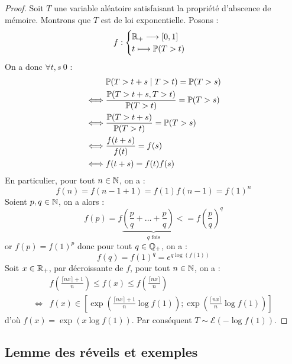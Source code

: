 \begin{proof}
    Soit $T$ une variable aléatoire satisfaisant la propriété d'abscence de mémoire. Montrons que $T$
    est de loi exponentielle. Posons : 
        $$ f : 
            \begin{cases}
                \mathbb{R}_+ \longrightarrow [0,1] \\ 
                t \longmapsto \mathbb{P}(T > t)  
            \end{cases}
        $$ 
    On a donc $ \forall t,s \> 0$ : 
        \begin{align*}
            & \mathbb{P}(T > t+s \mid T > t) = \mathbb{P}(T > s) \\ 
            \iff & \frac{\mathbb{P}(T > t+s, T > t)}{ \mathbb{P}(T > t) } = \mathbb{P}(T > s) \\ 
            \iff & \frac{\mathbb{P}(T > t+s)}{ \mathbb{P}(T > t) } = \mathbb{P}(T > s) \\ 
            \iff & \frac{f(t+s)}{f(t)} = f(s) \\ 
            \iff & f(t+s) = f(t) f(s)
        \end{align*}
    En particulier, pour tout $ n \in \mathbb{N}$, on a : 
        $$ f(n) = f(n - 1 + 1) = f(1)f(n-1) = f(1)^n $$ 
    Soient $p,q \in \mathbb{N}$, on a alors : 
        $$ f(p) = f \underbrace{\left( \frac{p}{q} + \dots + \frac{p}{q}\right)<}_{q \text{ fois} } = f \left(\frac{p}{q} \right)^q $$ 
    or $f(p) = f(1)^p$ donc pour tout $q \in \mathbb{Q}_+$, on a : 
        $$ f(q) = f(1)^q = e^{q \log(f(1))} $$ 
    Soit $x \in \mathbb{R}_+$, par décroissante de $f$, pour tout $ n \in \mathbb{N}$, on a :
        \begin{align*}
            & f \left( \frac{ \lceil nx \rceil +1}{n} \right) \leqslant f(x) \leqslant f \left( \frac{\lceil nx \rceil}{n} \right) \\ 
            \iff & f(x) \in \left[ \exp \left( \frac{\lceil nx \rceil +1}{n} \log f(1) \right); \exp \left( \frac{\lceil nx \rceil}{n} \log f(1)  \right) \right]
        \end{align*}
    d'où $f(x) = \exp ( x \log f(1))$. Par conséquent $ T \sim \mathcal{E}(- \log f(1)) $. 
\end{proof}

\subsection{Lemme des réveils et exemples}

